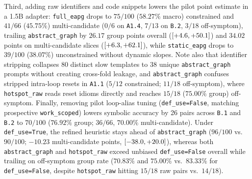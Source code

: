 Third, adding raw identifiers and code snippets lowers the pilot point estimate in a 1.5B adapter: \nolinkurl{full_eapg} drops to $75/100$ ($58.27\%$ macro) constrained and $41/66$ ($45.75\%$) multi-candidate ($0/6$ on \texttt{A1.4}, $7/13$ on \texttt{B.2}, $3/18$ off-symptom), trailing \nolinkurl{abstract_graph} by $26.17$ group points overall ($[+4.6, +50.1]$) and $34.02$ points on multi-candidate slices ($[+6.3, +62.1]$), while \nolinkurl{static_eapg} drops to $39/100$ ($38.07\%$) unconstrained without dynamic slopes. Note also that identifier stripping collapses 80 distinct slow templates to 38 unique \nolinkurl{abstract_graph} prompts without creating cross-fold leakage, and \nolinkurl{abstract_graph} confuses stripped intra-loop resets in \texttt{A1.1} ($5/12$ constrained; $11/18$ off-symptom), where \nolinkurl{hotspot_raw} reads reset idioms directly and reaches $15/18$ ($75.00\%$ group) off-symptom. Finally, removing pilot loop-alias tuning (\nolinkurl{def_use=False}, matching prospective \nolinkurl{work_scoped}) lowers symbolic accuracy by 26 pairs across \texttt{B.1} and \texttt{B.2} to $70/100$ ($76.92\%$ group; $36/66$, $70.00\%$ multi-candidate). Under \nolinkurl{def_use=True}, the refined heuristic stays ahead of \nolinkurl{abstract_graph} ($96/100$ vs.\ $90/100$; $-10.23$ multi-candidate points, $[-38.0, +20.0]$), whereas both \nolinkurl{abstract_graph} and \nolinkurl{hotspot_raw} exceed unbiased \nolinkurl{def_use=False} overall while trailing on off-symptom group rate ($70.83\%$ and $75.00\%$ vs.\ $83.33\%$ for \nolinkurl{def_use=False}, despite \nolinkurl{hotspot_raw} hitting $15/18$ raw pairs vs.\ $14/18$).

